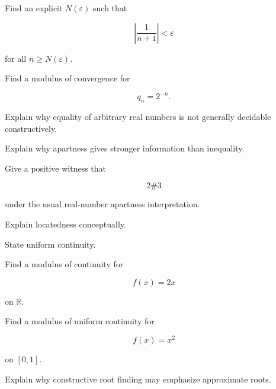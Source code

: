 \begin{exercise}[3]
Find an explicit \(N(\varepsilon)\) such that

\[
\left|
\frac{1}{n+1}
\right|
<
\varepsilon
\]

for all \(n\geq N(\varepsilon)\).
\end{exercise}

\begin{exercise}[3]
Find a modulus of convergence for

\[
q_n=2^{-n}.
\]
\end{exercise}

\begin{exercise}[3]
Explain why equality of arbitrary real numbers is not generally decidable
constructively.
\end{exercise}

\begin{exercise}[3]
Explain why apartness gives stronger information than inequality.
\end{exercise}

\begin{exercise}[3]
Give a positive witness that

\[
2\#3
\]

under the usual real-number apartness interpretation.
\end{exercise}

\begin{exercise}[3]
Explain locatedness conceptually.
\end{exercise}

\begin{exercise}[2]
State uniform continuity.
\end{exercise}

\begin{exercise}[3]
Find a modulus of continuity for

\[
f(x)=2x
\]

on \(\mathbb{R}\).
\end{exercise}

\begin{exercise}[3]
Find a modulus of uniform continuity for

\[
f(x)=x^2
\]

on \([0,1]\).
\end{exercise}

\begin{exercise}[3]
Explain why constructive root finding may emphasize approximate roots.
\end{exercise}

